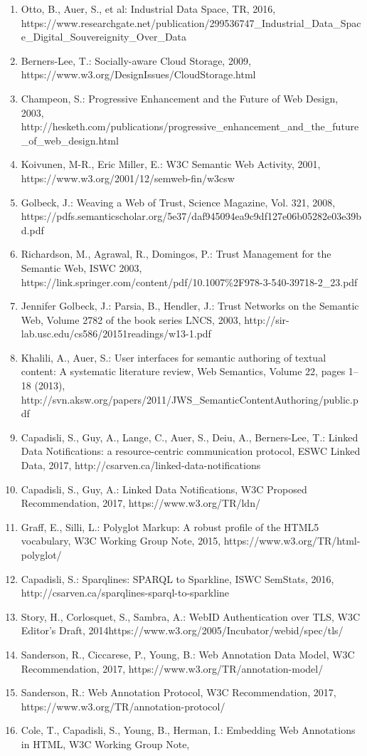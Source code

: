 \documentclass[a4paper]{llncs}
\begin{document}
                        
                            \begin{enumerate}
  \item Otto, B., Auer, S., et al: Industrial Data Space, TR, 2016, \empty https://www.researchgate.net/publication/299536747\_Industrial\_Data\_Space\_Digital\_Souvereignity\_Over\_Data\item Berners-Lee, T.: Socially-aware Cloud Storage, 2009, \empty https://www.w3.org/DesignIssues/CloudStorage.html\item Champeon, S.: Progressive Enhancement and the Future of Web Design, 2003, \empty http://hesketh.com/publications/progressive\_enhancement\_and\_the\_future\_of\_web\_design.html\item Koivunen, M-R., Eric Miller, E.: W3C Semantic Web Activity, 2001, \empty https://www.w3.org/2001/12/semweb-fin/w3csw\item Golbeck, J.: Weaving a Web of Trust, Science Magazine, Vol. 321, 2008, \empty https://pdfs.semanticscholar.org/5e37/daf945094ea9c9df127e06b05282e03e39bd.pdf\item Richardson, M., Agrawal, R., Domingos, P.: Trust Management for the Semantic Web, ISWC 2003, \empty https://link.springer.com/content/pdf/10.1007\%2F978-3-540-39718-2\_23.pdf\item Jennifer Golbeck, J.: Parsia, B., Hendler, J.: Trust Networks on the Semantic Web, Volume 2782 of the book series LNCS, 2003, \empty http://sir-lab.usc.edu/cs586/20151readings/w13-1.pdf\item Khalili, A., Auer, S.: User interfaces for semantic authoring of textual content: A systematic literature review, Web Semantics, Volume 22, pages 1–18 (2013), \empty http://svn.aksw.org/papers/2011/JWS\_SemanticContentAuthoring/public.pdf\item Capadisli, S., Guy, A., Lange, C., Auer, S., Deiu, A., Berners-Lee, T.: Linked Data Notifications: a resource-centric communication protocol, ESWC Linked Data, 2017, \empty http://csarven.ca/linked-data-notifications\item Capadisli, S., Guy, A.: Linked Data Notifications, W3C Proposed Recommendation, 2017, \empty https://www.w3.org/TR/ldn/\item Graff, E., Silli, L.: Polyglot Markup: A robust profile of the HTML5 vocabulary, W3C Working Group Note, 2015, \empty https://www.w3.org/TR/html-polyglot/\item Capadisli, S.: Sparqlines: SPARQL to Sparkline, ISWC SemStats, 2016, \empty http://csarven.ca/sparqlines-sparql-to-sparkline\item Story, H., Corlosquet, S., Sambra, A.: WebID Authentication over TLS, W3C Editor’s Draft, 2014\empty https://www.w3.org/2005/Incubator/webid/spec/tls/\item Sanderson, R., Ciccarese, P., Young, B.: Web Annotation Data Model, W3C Recommendation, 2017, \empty https://www.w3.org/TR/annotation-model/\item Sanderson, R.: Web Annotation Protocol, W3C Recommendation, 2017, \empty https://www.w3.org/TR/annotation-protocol/\item Cole, T., Capadisli, S., Young, B., Herman, I.: Embedding Web Annotations in HTML, W3C Working Group Note, 
\end{enumerate}
\end{document}
